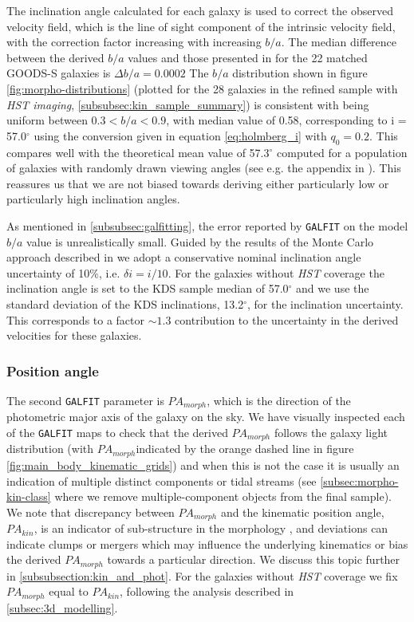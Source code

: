 \documentclass[fleqn,usenatbib]{mn2e}
\begin{document}
The inclination angle calculated for each galaxy is used to correct the observed velocity field, which is the line of sight component of the intrinsic velocity field, with the correction factor increasing with increasing $b/a$.
The median difference between the derived $b/a$ values and those presented in \cite{VanderWel2012} for the 22 matched GOODS-S galaxies is $\Delta b/a = 0.0002$
The $b/a$ distribution shown in figure \ref{fig:morpho-distributions} (plotted for the 28 galaxies in the refined sample with {\em HST imaging}, \cref{subsubsec:kin_sample_summary}) is consistent with being uniform between $0.3 < b/a < 0.9$, with median value of 0.58, corresponding to i = 57.0$^{\circ}$ using the conversion given in equation \ref{eq:holmberg_i} with $q_{0}=0.2$.
This compares well with the theoretical mean value of 57.3$^{\circ}$ computed for a population of galaxies with randomly drawn viewing angles (see e.g. the appendix in \cite{Law2009}).
This reassures us that we are not biased towards deriving either particularly low or particularly high inclination angles.

As mentioned in \cref{subsubsec:galfitting}, the error reported by {\tt GALFIT} on the model $b/a$ value is unrealistically small.
Guided by the results of the Monte Carlo approach described in \cite{Epinat2012} we adopt a conservative nominal inclination angle uncertainty of 10$\%$, i.e. $\delta i = i / 10$.
For the galaxies without {\em HST} coverage the inclination angle is set to the KDS sample median of 57.0$^{\circ}$ and we use the standard deviation of the KDS inclinations, 13.2$^{\circ}$, for the inclination uncertainty.
This corresponds to a factor $\sim1.3$ contribution to the uncertainty in the derived velocities for these galaxies.


\subsubsection{Position angle}\label{subsubsection:position_angle}
The second {\tt GALFIT} parameter is $PA_{morph}$, which is the direction of the photometric major axis of the galaxy on the sky.
We have visually inspected each of the {\tt GALFIT} maps to check that the derived $PA_{morph}$ follows the galaxy light distribution (with $PA_{morph}$indicated by the orange dashed line in figure \ref{fig:main_body_kinematic_grids}) and when this is not the case it is usually an indication of multiple distinct components or tidal streams (see \cref{subsec:morpho-kin-class} where we remove multiple-component objects from the final sample).
We note that discrepancy between $PA_{morph}$ and the kinematic position angle, $PA_{kin}$, is an indicator of sub-structure in the morphology \citep[e.g.][]{Queyrel2012,Wisnioski2015,Rodrigues2016}, and deviations can indicate clumps or mergers which may influence the underlying kinematics or bias the derived $PA_{morph}$ towards a particular direction.
We discuss this topic further in \cref{subsubsection:kin_and_phot}.
For the galaxies without {\em HST} coverage we fix $PA_{morph}$ equal to $PA_{kin}$, following the analysis described in \cref{subsec:3d_modelling}.
\end{document}
